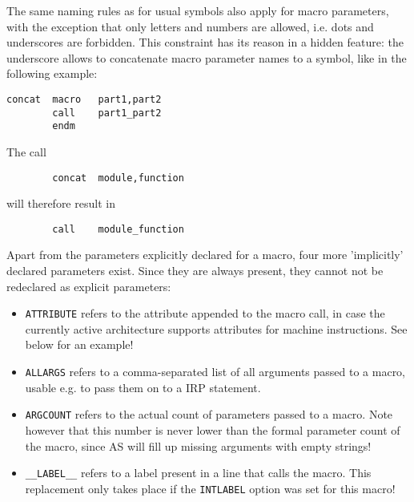 \documentclass[12pt,twoside]{report}
\begin{document}
The same naming rules as for usual symbols also apply for macro
parameters, with the exception that only letters and numbers are
allowed, i.e. dots and underscores are forbidden.  This constraint
has its reason in a hidden feature: the underscore allows to
concatenate macro parameter names to a symbol, like in the following
example:
\begin{verbatim}
concat  macro   part1,part2
        call    part1_part2
        endm
\end{verbatim}
The call
\begin{verbatim}
        concat  module,function
\end{verbatim}
will therefore result in
\begin{verbatim}
        call    module_function
\end{verbatim}
Apart from the parameters explicitly declared for a macro, four more
'implicitly' declared parameters exist.   Since they are always present,
they cannot not be redeclared as explicit parameters:
\begin{itemize}
\item{{\tt ATTRIBUTE} refers to the attribute appended to the macro call,
      in case the currently active architecture supports attributes for
      machine instructions.  See below for an example!}
\item{{\tt ALLARGS} refers to a comma-separated list of all arguments 
      passed to a macro, usable e.g. to pass them on to a IRP statement.}
\item{{\tt ARGCOUNT} refers to the actual count of parameters passed to
      a macro.  Note however that this number is never lower than the
      formal parameter count of the macro, since AS will fill up missing
      arguments with empty strings!}
\item{{\tt \_\_LABEL\_\_} refers to a label present in a line that calls the
      macro. This replacement only takes place if the {\tt INTLABEL}
      option was set for this macro!}
\end{itemize}
\end{document}
